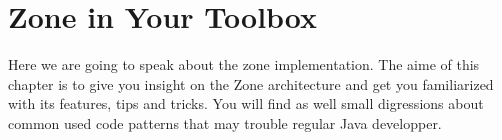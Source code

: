 
\chapter{Zone in Your Toolbox}

Here we are going to speak about the zone implementation.
The aime of this chapter is to give you insight on the Zone architecture and get you familiarized with its features, tips and tricks.
You will find as well small digressions about common used code patterns that may trouble regular Java developper.